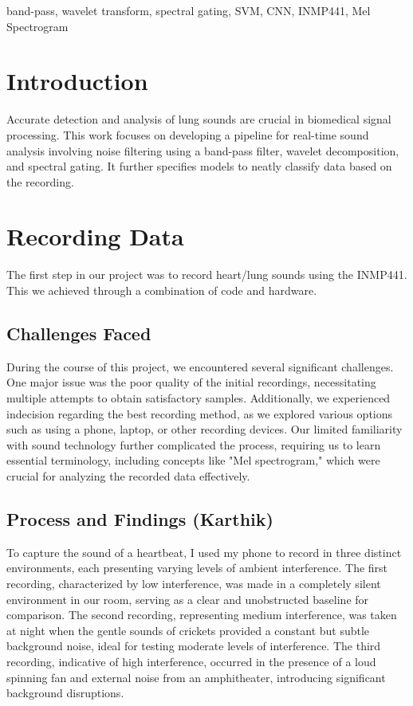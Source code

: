 \documentclass[conference]{IEEEtran}
\begin{document}
\begin{IEEEkeywords}
band-pass, wavelet transform, spectral gating, SVM, CNN, INMP441, Mel Spectrogram
\end{IEEEkeywords}

\section*{Introduction}
Accurate detection and analysis of lung sounds are crucial in
biomedical signal processing. This work focuses on developing
a pipeline for real-time sound analysis involving noise filtering
using a band-pass filter, wavelet decomposition, and spectral gating. It further specifies models to neatly classify data based on the recording.

\section{Recording Data}
The first step in our project was to record heart/lung sounds using the INMP441. This we achieved through a combination of code and hardware.

\subsection{Challenges Faced}

During the course of this project, we encountered several significant challenges. One major issue was the poor quality of the initial recordings, necessitating multiple attempts to obtain satisfactory samples. Additionally, we experienced indecision regarding the best recording method, as we explored various options such as using a phone, laptop, or other recording devices. Our limited familiarity with sound technology further complicated the process, requiring us to learn essential terminology, including concepts like "Mel spectrogram," which were crucial for analyzing the recorded data effectively.

\subsection{Process and Findings (Karthik)}

To capture the sound of a heartbeat, I used my phone to record in three distinct environments, each presenting varying levels of ambient interference. The first recording, characterized by low interference, was made in a completely silent environment in our room, serving as a clear and unobstructed baseline for comparison. The second recording, representing medium interference, was taken at night when the gentle sounds of crickets provided a constant but subtle background noise, ideal for testing moderate levels of interference. The third recording, indicative of high interference, occurred in the presence of a loud spinning fan and external noise from an amphitheater, introducing significant background disruptions.
\end{document}
